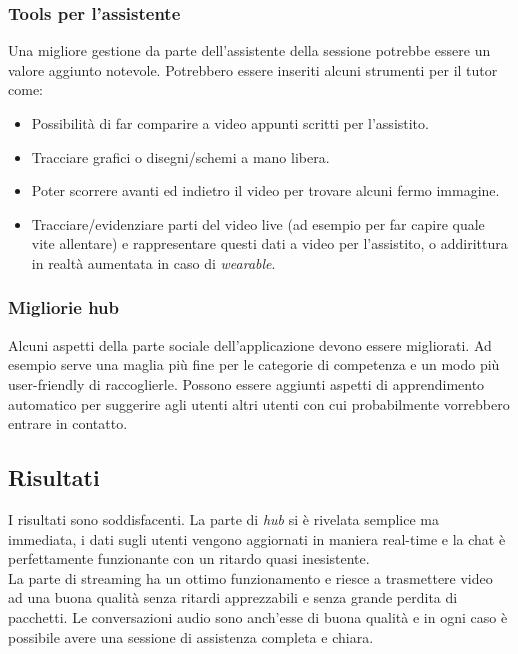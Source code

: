 \documentclass[conference]{IEEEtran}
\begin{document}
		\subsubsection{Tools per l'assistente}
			Una migliore gestione da parte dell'assistente della sessione potrebbe essere un valore aggiunto notevole.
			Potrebbero essere inseriti alcuni strumenti per il tutor come:
			\begin{itemize}
				\item Possibilità di far comparire a video appunti scritti per l'assistito.
				\item Tracciare grafici o disegni/schemi a mano libera.
				\item Poter scorrere avanti ed indietro	il video per trovare alcuni fermo immagine.
				\item Tracciare/evidenziare parti del video live (ad esempio per far capire quale vite allentare)
					e rappresentare questi dati a video per l'assistito, o addirittura in realtà aumentata in caso
					di \textit{wearable}.
			\end{itemize}

		\subsubsection{Migliorie hub}
			Alcuni aspetti della parte sociale dell'applicazione devono essere migliorati. Ad esempio serve
			una maglia più fine per le categorie di competenza e un modo più user-friendly di raccoglierle.
			Possono essere aggiunti aspetti di apprendimento automatico per suggerire agli utenti altri
			utenti con cui probabilmente vorrebbero entrare in contatto.

	\subsection{Risultati}
		I risultati sono soddisfacenti. La parte di \textit{hub} si è rivelata semplice ma immediata, i dati sugli 
		utenti vengono aggiornati in maniera real-time e la chat è perfettamente funzionante con un ritardo quasi
		inesistente.\\
		La parte di streaming ha un ottimo funzionamento e riesce a trasmettere video ad una buona qualità senza
		ritardi apprezzabili e senza grande perdita di pacchetti. Le conversazioni audio sono anch'esse di buona
		qualità e in ogni caso è possibile avere una sessione di assistenza completa e chiara.
	
\end{document}
